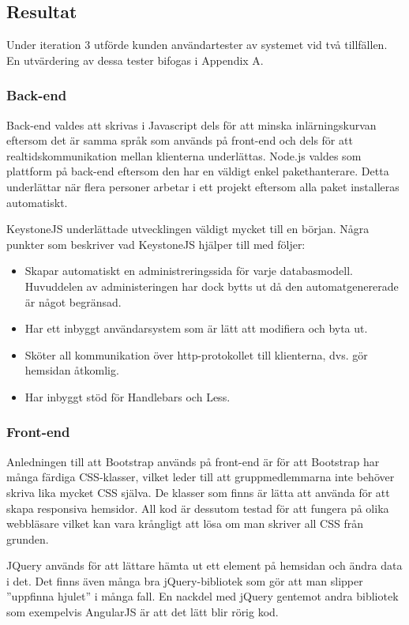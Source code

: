 \documentclass{article}
\begin{document}
\subsection{Resultat}
Under iteration 3 utförde kunden användartester av systemet vid två tillfällen. En utvärdering av dessa tester bifogas i Appendix A.

\subsubsection{Back-end}
Back-end valdes att skrivas i Javascript dels för att minska inlärningskurvan eftersom det är samma språk som används på front-end och dels för att realtidskommunikation mellan klienterna underlättas. Node.js valdes som plattform på back-end eftersom den har en väldigt enkel pakethanterare. Detta underlättar när flera personer arbetar i ett projekt eftersom alla paket installeras automatiskt.

KeystoneJS underlättade utvecklingen väldigt mycket till en början. Några punkter som beskriver vad KeystoneJS hjälper till med följer:

  \begin{itemize}
    \item Skapar automatiskt en administreringssida för varje databasmodell.
      Huvuddelen av administeringen har dock bytts ut då den automatgenererade är något begränsad.
    \item Har ett inbyggt användarsystem som är lätt att modifiera och byta ut.
    \item Sköter all kommunikation över http-protokollet till klienterna, dvs. gör hemsidan åtkomlig.
    \item Har inbyggt stöd för Handlebars och Less.
  \end{itemize}
  
\subsubsection{Front-end}
Anledningen till att Bootstrap används på front-end är för att Bootstrap har många färdiga CSS-klasser, vilket leder till att gruppmedlemmarna inte behöver skriva lika mycket CSS själva.
De klasser som finns är lätta att använda för att skapa responsiva hemsidor.
All kod är dessutom testad för att fungera på olika webbläsare vilket kan vara krångligt att lösa om man skriver all CSS från grunden.

JQuery används för att lättare hämta ut ett element på hemsidan och ändra data i det.
Det finns även många bra jQuery-bibliotek som gör att man slipper ''uppfinna hjulet'' i många fall. En nackdel med jQuery gentemot andra bibliotek som exempelvis AngularJS \cite{angular} är att det lätt blir rörig kod.
\end{document}

